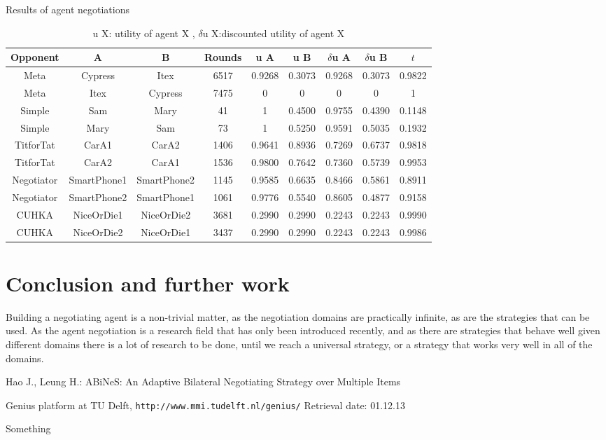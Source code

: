 \documentclass[html]{report}    %
\begin{document}
\begin{table}[ht] 

\centering %
\caption{Results of agent negotiations} %
\begin{tabular}{ccccccccc} %
\hline\hline %
 Opponent & A  &  B & Rounds & u A & u B & $\delta$u A & $\delta$u B & $t$\\ [0.5ex] %
\hline
\hline %
Meta&Cypress&Itex&6517&0.9268&0.3073&0.9268&0.3073&0.9822\\
Meta&Itex&Cypress&7475&0&0&0&0&1\\
Simple&Sam&Mary&41&1&0.4500&0.9755&0.4390&0.1148\\
Simple&Mary&Sam&73&1&0.5250&0.9591&0.5035&0.1932\\ 
TitforTat&CarA1&CarA2&1406&0.9641&0.8936&0.7269&0.6737&0.9818\\
TitforTat&CarA2&CarA1&1536&0.9800&0.7642&0.7360&0.5739&0.9953\\
Negotiator&SmartPhone1&SmartPhone2&1145&0.9585&0.6635&0.8466&0.5861&0.8911\\
Negotiator&SmartPhone2&SmartPhone1&1061&0.9776&0.5540&0.8605&0.4877&0.9158\\
CUHKA&NiceOrDie1&NiceOrDie2&3681&0.2990&0.2990&0.2243&0.2243&0.9990\\
CUHKA&NiceOrDie2&NiceOrDie1&3437&0.2990&0.2990&0.2243&0.2243&0.9986\\
[1ex] %
\hline %
\end{tabular} 
\caption{u X: utility of agent X , $\delta$u X:discounted utility of agent X} %
\label{table:NegoSimpleresults} %
\end{table} 

\section{Conclusion and further work}
Building a negotiating agent is a non-trivial matter, as the negotiation domains are practically infinite, as are the strategies that can be used. As the agent negotiation is a research field that has only been introduced recently, and as there are strategies that behave well given different domains there is a lot of research to be done, until we reach a universal strategy, or a strategy that works very well in all of the domains.

\begin{thebibliography}{}

Hao J., Leung H.:
ABiNeS: An Adaptive Bilateral Negotiating Strategy over Multiple Items

Genius platform at TU Delft,
\texttt{http://www.mmi.tudelft.nl/genius/} Retrieval date: 01.12.13

Something

\end{thebibliography}
\end{document}
